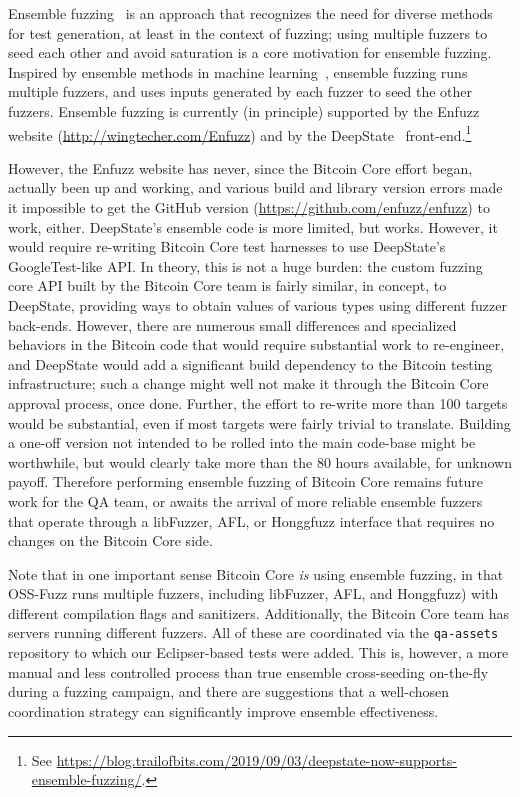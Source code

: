Ensemble fuzzing~\cite{chen2019enfuzz} is an approach that recognizes the need for
diverse methods for test generation, at least in the context of
fuzzing; using multiple fuzzers to seed each other and avoid saturation is a core motivation for ensemble fuzzing.   Inspired by ensemble methods in machine learning~\cite{dietterich2002ensemble},
ensemble fuzzing runs multiple fuzzers, and uses inputs generated by
each fuzzer to seed the other fuzzers.  Ensemble fuzzing is currently (in principle)
supported by the Enfuzz website  (\url{http://wingtecher.com/Enfuzz})
and by the DeepState~\cite{goodman2018deepstate} front-end.\footnote{See
  \url{https://blog.trailofbits.com/2019/09/03/deepstate-now-supports-ensemble-fuzzing/}.}

However, the Enfuzz website has never, since the Bitcoin Core effort began, actually been up and working, and various build and library version errors made it impossible to get the GitHub version (\url{https://github.com/enfuzz/enfuzz}) to work, either.  DeepState's ensemble code is more limited, but works.  However, it would require re-writing Bitcoin Core test harnesses to use DeepState's GoogleTest-like API.  In theory, this is not a huge burden: the custom fuzzing core API built by the Bitcoin Core team is fairly similar, in concept, to DeepState, providing ways to obtain values of various types using different fuzzer back-ends.  However, there are numerous small differences and specialized behaviors in the Bitcoin code that would require substantial work to re-engineer, and DeepState would add a significant build dependency to the Bitcoin testing infrastructure; such a change might well not make it through the Bitcoin Core approval process, once done.   Further, the effort to re-write more than 100 targets would be substantial, even if most targets were fairly trivial to translate. Building a one-off version not intended to be rolled into the main code-base might be worthwhile, but would clearly take more than the 80 hours available, for unknown payoff.   Therefore performing ensemble fuzzing of Bitcoin Core remains future work for the QA team, or awaits the arrival of more reliable ensemble fuzzers that operate through a libFuzzer, AFL, or Honggfuzz interface that requires no changes on the Bitcoin Core side.

Note that in one important sense Bitcoin Core \emph{is} using ensemble fuzzing, in that OSS-Fuzz runs multiple fuzzers, including libFuzzer, AFL, and Honggfuzz) with different compilation flags and sanitizers.  Additionally, the Bitcoin Core team has servers running different fuzzers.  All of these are coordinated via the {\tt qa-assets} repository to which our Eclipser-based tests were added.  This is, however, a more manual and less controlled process than true ensemble cross-seeding on-the-fly during a fuzzing campaign, and there are suggestions that a well-chosen coordination strategy can significantly improve ensemble effectiveness.
